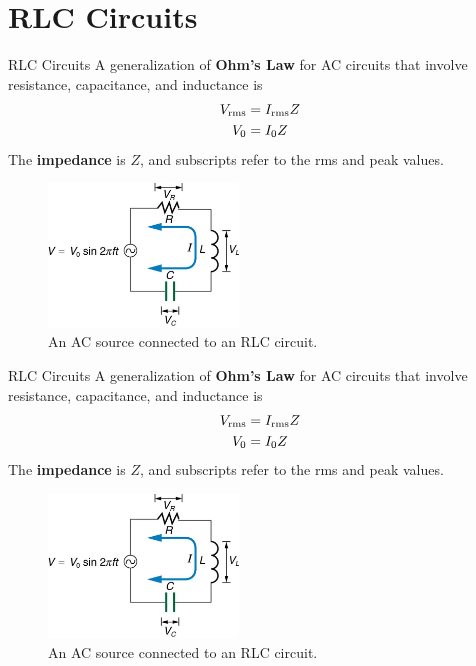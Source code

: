 \documentclass{beamer}
\begin{document}
\section{RLC Circuits}

\begin{frame}{RLC Circuits}
\small
A generalization of \textbf{\alert{Ohm's Law}} for AC circuits that involve resistance, capacitance, and inductance is
\begin{align}
V_{\rm rms} &= I_{\rm rms} Z \\
V_{0} &= I_{0} Z
\end{align}
The \textbf{\alert{impedance}} is $Z$, and subscripts refer to the rms and peak values.
\begin{figure}
\centering
\includegraphics[width=0.45\textwidth]{figures/phase5.png}
\caption{\label{fig:phase5} An AC source connected to an RLC circuit.}
\end{figure}
\end{frame}

\begin{frame}{RLC Circuits}
\small
A generalization of \textbf{\alert{Ohm's Law}} for AC circuits that involve resistance, capacitance, and inductance is
\begin{align}
V_{\rm rms} &= I_{\rm rms} Z \\
V_{0} &= I_{0} Z
\end{align}
The \textbf{\alert{impedance}} is $Z$, and subscripts refer to the rms and peak values.
\begin{figure}
\centering
\includegraphics[width=0.45\textwidth]{figures/phase5.png}
\caption{\label{fig:phase6} An AC source connected to an RLC circuit.}
\end{figure}
\end{frame}
\end{document}
